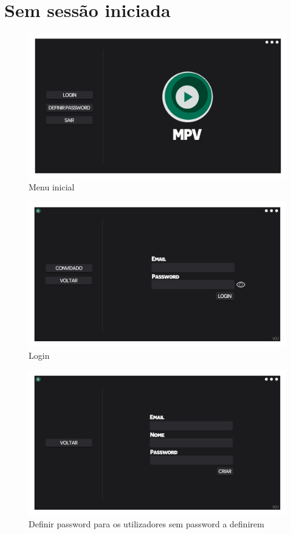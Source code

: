 \documentclass[a4paper]{report}
\begin{document}
\section{Sem sessão iniciada}

\begin{figure}[H]
	\centering 
    \includegraphics[width=\textwidth]{images/Inicio_Menu.png}  
    \caption{Menu inicial}
\end{figure}

\begin{figure}[H]
	\centering 
    \includegraphics[width=\textwidth]{images/Login_Menu.png}  
    \caption{Login}
\end{figure}

\begin{figure}[H]
	\centering 
    \includegraphics[width=\textwidth]{images/DefinirPassword_Menu.png}  
    \caption{Definir password para os utilizadores sem password a definirem}
\end{figure}
\end{document}
